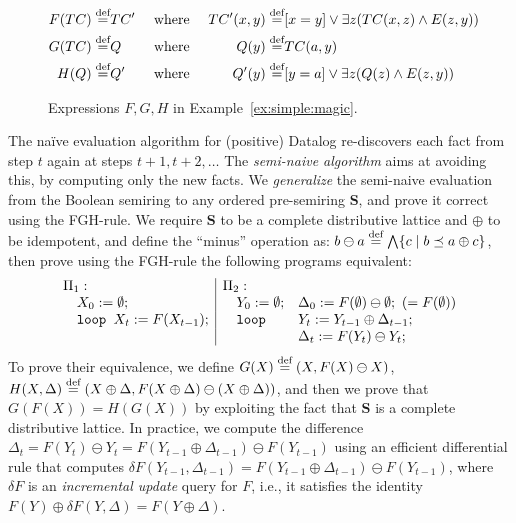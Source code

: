 \begin{figure}
  \begin{alignat*}{3}
    F(TC) \stackrel{\text{def}}{=} & TC' &&\mbox{ where } & TC'(x,y) \stackrel{\text{def}}{=} &[x=y] \vee \exists z(TC(x,z) \wedge E(z,y)) \\
    G(TC) \stackrel{\text{def}}{=} & Q   &&\mbox{ where } & Q(y) \stackrel{\text{def}}{=} & TC(a,y) \\
    H(Q) \stackrel{\text{def}}{=} & Q'   &&\mbox{ where } & Q'(y) \stackrel{\text{def}}{=} & [y=a] \vee \exists z(Q(z) \wedge E(z,y))
  \end{alignat*}
\caption{Expressions $F,G,H$ in Example~\ref{ex:simple:magic}.}
  \label{fig:simple:magic}
\end{figure}

\begin{ex} The na\"ive evaluation
    algorithm for (positive) Datalog re-discovers each fact from step $t$ again at
    steps $t+1, t+2, \ldots$ The {\em semi-naive algorithm} aims at avoiding
  this, by computing only the new facts.  We {\em generalize} the semi-naive
  evaluation from the Boolean semiring to any ordered pre-semiring
  $\bm S$, and prove it correct using the FGH-rule.  We require
  $\bm S$ to be a complete distributive lattice and $\oplus$ to be
  idempotent, and define the ``minus'' operation as:
  $b \ominus a \stackrel{\text{def}}{=} \bigwedge \{{c}\mid{b \preceq a \oplus c}\}$, then prove using
  the FGH-rule the following programs equivalent:
%
  \begin{align*}
    \begin{array}{ll|lll}
      \Pi_1: \hspace{-8mm} & & \Pi_2: \hspace{-8mm} && \\
      & X_0 := \emptyset;               && Y_0 := \emptyset;  & \Delta_0 := F(\emptyset)  \ominus \emptyset;\    (= F(\emptyset)) \\
      & \texttt{loop } X_t := F(X_{t-1}); && \texttt{loop } & Y_t := Y_{t-1} \oplus \Delta_{t-1};\\
      &                                 &&              & \Delta_t := F(Y_{t}) \ominus Y_{t};
    \end{array}
  \end{align*}
%
  To prove their equivalence, we define $G(X)\stackrel{\text{def}}{=} (X, F(X)\ominus X)$,
  $H(X,\Delta) \stackrel{\text{def}}{=} (X \oplus \Delta, F(X\oplus \Delta )\ominus (X\oplus \Delta))$, and then we prove
  that $G(F(X)) = H(G(X))$ by exploiting the fact that $\bm S$ is a
  complete distributive lattice. In practice, we compute the
  difference $\Delta_t = F(Y_{t})\ominus Y_{t} =
  F(Y_{t-1}\oplus \Delta_{t-1}) \ominus F(Y_{t-1})$
  using an efficient differential rule
  that computes
  $\delta F(Y_{t-1}, \Delta_{t-1}) =
  F(Y_{t-1}\oplus \Delta_{t-1}) \ominus F(Y_{t-1})$, where $\delta F$ is
  an {\em incremental update} query for $F$, i.e., it satisfies the
  identity $F(Y) \oplus \delta F(Y, \Delta) = F(Y\oplus \Delta)$.


\end{ex}
